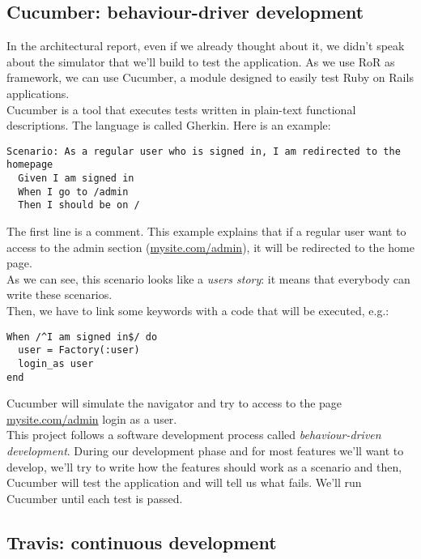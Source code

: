 \subsection{Cucumber: behaviour-driver development}
\label{SEC:Cucumber}
In the architectural report, even if we already thought about it, we didn't speak about the simulator that we'll build to test the application. As we use RoR as framework, we can use Cucumber, a module designed to easily test Ruby on Rails applications.\\

Cucumber is a tool that executes tests written in plain-text functional descriptions. The language is called Gherkin. Here is an example:

\begin{lstlisting}[morekeywords={Scenario,Given,When,Then,And},deletekeywords={in}]
Scenario: As a regular user who is signed in, I am redirected to the homepage
  Given I am signed in
  When I go to /admin
  Then I should be on /
\end{lstlisting}
The first line is a comment. This example explains that if a regular user want to access to the admin section (\url{mysite.com/admin}), it will be redirected to the home page.\\

As we can see, this scenario looks like a \textit{users story}: it means that everybody can write these scenarios.\\
Then, we have to link some keywords with a code that will be executed, e.g.:
\begin{lstlisting}[morekeywords={When}]
When /^I am signed in$/ do
  user = Factory(:user)
  login_as user
end 
\end{lstlisting}
Cucumber will simulate the navigator and try to access to the page \url{mysite.com/admin} login as a user.\\

This project follows a software development process called \textit{behaviour-driven development}. During our development phase and for most features we'll want to develop, we'll try to write how the features should work as a scenario and then, Cucumber will test the application and will tell us what fails. We'll run Cucumber until each test is passed.\\

\subsection{Travis: continuous development}

